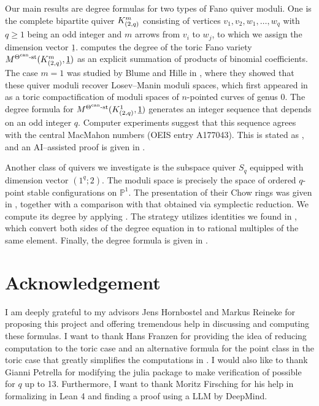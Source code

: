 \documentclass[11pt]{article}
\begin{document}
Our main results are degree formulas for two types of Fano quiver moduli. One is the complete bipartite quiver \(K_{(2,q)}^m\) consisting of vertices \(v_1, v_2, w_1, \dots, w_q\) with \(q\geq 1\) being an odd integer and \(m\) arrows from \(v_i\) to \(w_j\), to which we assign the dimension vector \(\underline{1}\).  computes the degree of the toric Fano variety \(M^{\Theta^{\text{can}}\text{-st}}(K_{(2,q)}^m, \underline{1})\) as an explicit summation of products of binomial coefficients. The case \(m=1\) was studied by Blume and Hille in \cite{BlumeHille21}, where they showed that these quiver moduli recover Losev--Manin moduli spaces, which first appeared in \cite{LosevManin00} as a toric compactification of moduli spaces of \(n\)-pointed curves of genus 0. The degree formula for \(M^{\Theta^{\text{can}}\text{-st}}(K_{(2,q)}^1, \underline{1})\) generates an integer sequence that depends on an odd integer \(q\). Computer experiments suggest that this sequence agrees with the central MacMahon numbers (OEIS entry A177043). This is stated as , and an AI--assisted proof is given in . 

Another class of quivers we investigate is the subspace quiver \(S_q\) equipped with dimension vector \((1^q;2)\). The moduli space is precisely the space of ordered \(q\)-point stable configurations on \(\mathbb{P}^1\). The presentation of their Chow rings was given in \cite[Corollary 29]{franzen2015chow}, together with a comparison with that obtained via symplectic reduction. We compute its degree by applying . The strategy utilizes identities we found in , which convert both sides of the degree equation in  to rational multiples of the same element. Finally, the degree formula is given in . 

\section*{Acknowledgement}

I am deeply grateful to my advisors Jens Hornbostel and Markus Reineke for proposing this project and offering tremendous help in discussing and computing these formulas. I want to thank Hans Franzen for providing the idea of reducing computation to the toric case and an alternative formula for the point class in the toric case that greatly simplifies the computations in . I would also like to thank Gianni Petrella for modifying the julia package \cite{quivertools} to make verification of  possible for \(q\) up to 13. Furthermore, I want to thank Moritz Firsching for his help in formalizing  in Lean 4 and finding a proof using a LLM by DeepMind. 
\end{document}
